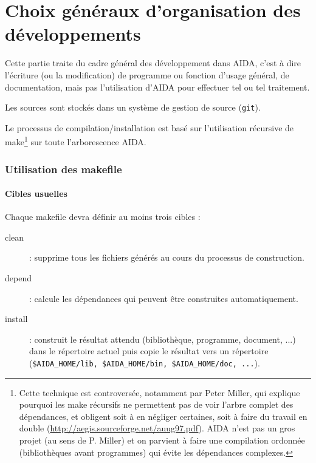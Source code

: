 \part{Choix généraux d'organisation des développements}
\label{part:dev_gene}

Cette partie traite du cadre général des développement dans AIDA, c'est à dire
l'écriture (ou la modification) de programme ou fonction d'usage général, de
documentation, mais pas l'utilisation d'AIDA pour effectuer tel ou tel
traitement.

Les sources sont stockés dans un système de gestion
de source (\texttt{git}).

Le processus de compilation/installation est basé sur l'utilisation récursive
de make\footnote{\label{make}Cette technique est controversée, notamment par
Peter Miller, qui explique pourquoi les make récursifs ne permettent pas de
voir l'arbre complet des dépendances, et obligent soit à en négliger certaines,
soit à faire du travail en double
(\url{http://aegis.sourceforge.net/auug97.pdf}).  AIDA n'est pas un gros projet
(au sens de P. Miller) et on parvient à faire une compilation ordonnée
(bibliothèques avant programmes) qui évite les dépendances complexes.}
sur toute l'arborescence AIDA.


\section{Utilisation des makefile}
\label{sec:make}

\subsection{Cibles usuelles}
Chaque makefile devra définir au moins trois cibles  :

\begin{description}
  \item[clean] : supprime tous les fichiers générés au cours du processus de
    construction.
  \item[depend] : calcule les dépendances qui peuvent être construites
    automatiquement.
  \item[install] : construit le résultat attendu (bibliothèque, programme,
    document, ...) dans le répertoire actuel puis copie le résultat vers un
    répertoire
    (\texttt{\$AIDA\_HOME/lib, \$AIDA\_HOME/bin, \$AIDA\_HOME/doc, ...}).
\end{description}
\bigbreak


